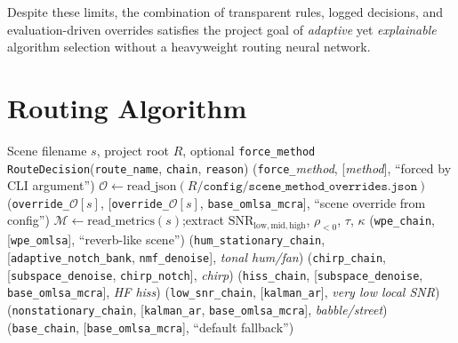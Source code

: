 Despite these limits, the combination of transparent rules, logged decisions, and evaluation-driven overrides satisfies the project goal of \emph{adaptive} yet \emph{explainable} algorithm selection without a heavyweight routing neural network.
\section{Routing Algorithm}
\label{sec:routing_algorithm}

\begin{algorithm}[H]
  \caption{Scene-aware route selection (\texttt{choose\_route})}
  \label{alg:choose_route}
  \begin{algorithmic}[1]
    \Require Scene filename $s$, project root $R$, optional \texttt{force\_method}
    \Ensure \texttt{RouteDecision}(\texttt{route\_name}, \texttt{chain}, \texttt{reason})
      \State \Return (\texttt{force\_}\textit{method}, [\textit{method}], ``forced by CLI argument'')
    \EndIf
    \State $\mathcal{O} \gets \text{read\_json}(R/\texttt{config/scene\_method\_overrides.json})$
      \State \Return (\texttt{override\_}$\mathcal{O}[s]$, [\texttt{override\_}$\mathcal{O}[s]$, \texttt{base\_omlsa\_mcra}], ``scene override from config'')
    \EndIf
    \State $\mathcal{M} \gets \text{read\_metrics}(s)$;\quad extract $\mathrm{SNR}_{\mathrm{low,mid,high}}$, $\rho_{<0}$, $\tau$, $\kappa$
      \State \Return (\texttt{wpe\_chain}, [\texttt{wpe\_omlsa}], ``reverb-like scene'')
    \EndIf
      \State \Return (\texttt{hum\_stationary\_chain}, [\texttt{adaptive\_notch\_bank}, \texttt{nmf\_denoise}], \textit{tonal hum/fan})
    \EndIf
      \State \Return (\texttt{chirp\_chain}, [\texttt{subspace\_denoise}, \texttt{chirp\_notch}], \textit{chirp})
    \EndIf
      \State \Return (\texttt{hiss\_chain}, [\texttt{subspace\_denoise}, \texttt{base\_omlsa\_mcra}], \textit{HF hiss})
    \EndIf
      \State \Return (\texttt{low\_snr\_chain}, [\texttt{kalman\_ar}], \textit{very low local SNR})
    \EndIf
      \State \Return (\texttt{nonstationary\_chain}, [\texttt{kalman\_ar}, \texttt{base\_omlsa\_mcra}], \textit{babble/street})
    \EndIf
    \State \Return (\texttt{base\_chain}, [\texttt{base\_omlsa\_mcra}], ``default fallback'')
  \end{algorithmic}
\end{algorithm}

